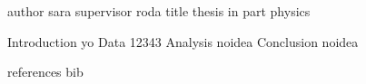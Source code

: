 author  sara
supervisor roda
title  thesis in part physics

Introduction  yo
Data  12343
Analysis  noidea
Conclusion noidea

references  bib 
